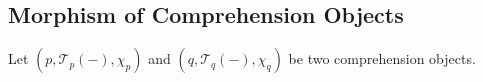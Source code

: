 \documentclass[10pt]{article}
\newtheorem{theorem}{Theorem}
\theoremstyle{definition}
\newcommand\TrPlus[2]{\ensuremath{{#1}^+(#2)}}
\newcommand\TrCirc[2]{\ensuremath{{#1}^\circ(#2)}}
\newcommand\var[1]{\ensuremath{\mathsf{var}_{#1}}}
\newcommand{\id}{\mathsf{id}}
\newcommand\El[2]{\mathcal{T}_{#1}(#2)}
\newcommand\ApEl[2]{\mathcal{T}_{#1}\langle#2\rangle}
\newcommand\ap[2]{\ensuremath{#1 \langle #2 \rangle }}
\newcommand\bdot[0]{\mathbin{.}}
\begin{document}

%

\subsection{Morphism of Comprehension Objects}

Let $(p,\El{p}{-},\chi_p)$ and $(q,\El{q}{-},\chi_q)$ be two comprehension objects.
\end{document}
